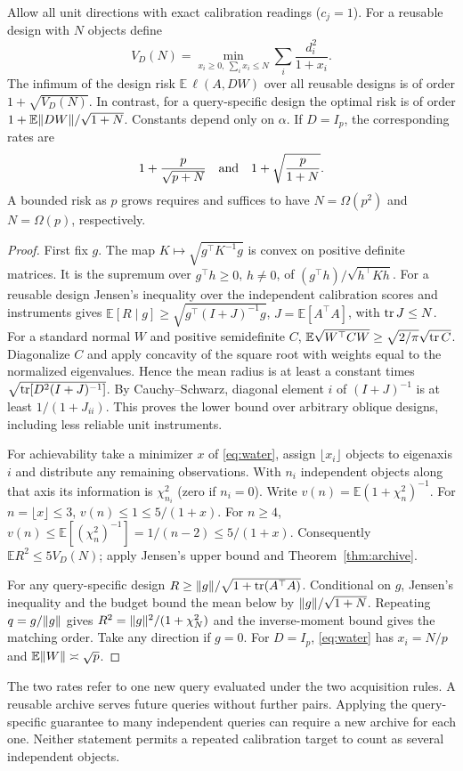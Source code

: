 \begin{theorem}\label{thm:budget}
Allow all unit directions with exact calibration readings ($c_j=1$). For a reusable design with $N$ objects define
\begin{equation}
 V_D(N)=\min_{x_i\ge0,\ \sum_i x_i\le N}\sum_i\frac{d_i^2}{1+x_i}.
 \label{eq:water}
\end{equation}
The infimum of the design risk $\mathbb E\,\ell(A,DW)$ over all reusable designs is of order $1+\sqrt{V_D(N)}$. In contrast, for a query-specific design the optimal risk is of order $1+\mathbb E\lVert DW\rVert/\sqrt{1+N}$. Constants depend only on $\alpha$. If $D=I_p$, the corresponding rates are
\[
 1+\frac{p}{\sqrt{p+N}}\quad\hbox{and}\quad 1+\sqrt{\frac{p}{1+N}}.
\]
A bounded risk as $p$ grows requires and suffices to have $N=\Omega(p^2)$ and $N=\Omega(p)$, respectively.
\end{theorem}
\begin{proof}
First fix $g$. The map $K\mapsto\sqrt{g^\top K^{-1}g}$ is convex on positive definite matrices. It is the supremum over $g^\top h\ge0$, $h\ne0$, of $(g^\top h)/\sqrt{h^\top Kh}$. For a reusable design Jensen's inequality over the independent calibration scores and instruments gives $\mathbb E[R\mid g]\ge\sqrt{g^\top(I+J)^{-1}g}$, $J=\mathbb E[A^\top A]$, with $\operatorname{tr} J\le N$. For a standard normal $W$ and positive semidefinite $C$, $\mathbb E\sqrt{W^\top C W}\ge\sqrt{2/\pi}\sqrt{\operatorname{tr} C}$. Diagonalize $C$ and apply concavity of the square root with weights equal to the normalized eigenvalues. Hence the mean radius is at least a constant times $\sqrt{\operatorname{tr}[D^2(I+J)^{-1}]}$. By Cauchy--Schwarz, diagonal element $i$ of $(I+J)^{-1}$ is at least $1/(1+J_{ii})$. This proves the lower bound over arbitrary oblique designs, including less reliable unit instruments.

For achievability take a minimizer $x$ of \eqref{eq:water}, assign $\lfloor x_i\rfloor$ objects to eigenaxis $i$ and distribute any remaining observations. With $n_i$ independent objects along that axis its information is $\chi^2_{n_i}$ (zero if $n_i=0$). Write $v(n)=\mathbb E(1+\chi^2_n)^{-1}$. For $n=\lfloor x\rfloor\le3$, $v(n)\le1\le5/(1+x)$. For $n\ge4$, $v(n)\le\mathbb E[(\chi^2_n)^{-1}]=1/(n-2)\le5/(1+x)$. Consequently $\mathbb E R^2\le5 V_D(N)$; apply Jensen's upper bound and Theorem~\ref{thm:archive}.

For any query-specific design $R\ge\lVert g\rVert/\sqrt{1+\operatorname{tr}(A^\top A)}$. Conditional on $g$, Jensen's inequality and the budget bound the mean below by $\lVert g\rVert/\sqrt{1+N}$. Repeating $q=g/\lVert g\rVert$ gives $R^2=\lVert g\rVert^2/(1+\chi^2_N)$ and the inverse-moment bound gives the matching order. Take any direction if $g=0$. For $D=I_p$, \eqref{eq:water} has $x_i=N/p$ and $\mathbb E\lVert W\rVert\asymp\sqrt p$.
\end{proof}
The two rates refer to one new query evaluated under the two acquisition rules. A reusable archive serves future queries without further pairs. Applying the query-specific guarantee to many independent queries can require a new archive for each one. Neither statement permits a repeated calibration target to count as several independent objects.

